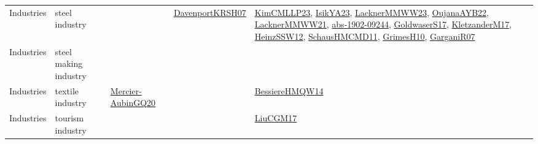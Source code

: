 {\begin{longtable}{lp{3cm}>{\raggedright}p{6cm}>{\raggedright}p{6cm}p{8cm}}
Industries & steel industry &  & \href{papers/DavenportKRSH07.pdf}{DavenportKRSH07}\cite{DavenportKRSH07} & \href{papers/KimCMLLP23.pdf}{KimCMLLP23}\cite{KimCMLLP23}, \href{articles/IsikYA23.pdf}{IsikYA23}\cite{IsikYA23}, \href{articles/LacknerMMWW23.pdf}{LacknerMMWW23}\cite{LacknerMMWW23}, \href{papers/OujanaAYB22.pdf}{OujanaAYB22}\cite{OujanaAYB22}, \href{papers/LacknerMMWW21.pdf}{LacknerMMWW21}\cite{LacknerMMWW21}, \href{articles/abs-1902-09244.pdf}{abs-1902-09244}\cite{abs-1902-09244}, \href{papers/GoldwaserS17.pdf}{GoldwaserS17}\cite{GoldwaserS17}, \href{papers/KletzanderM17.pdf}{KletzanderM17}\cite{KletzanderM17}, \href{articles/HeinzSSW12.pdf}{HeinzSSW12}\cite{HeinzSSW12}, \href{articles/SchausHMCMD11.pdf}{SchausHMCMD11}\cite{SchausHMCMD11}, \href{papers/GrimesH10.pdf}{GrimesH10}\cite{GrimesH10}, \href{papers/GarganiR07.pdf}{GarganiR07}\cite{GarganiR07}\\
Industries & steel making industry &  &  & \\
Industries & textile industry & \href{papers/Mercier-AubinGQ20.pdf}{Mercier-AubinGQ20}\cite{Mercier-AubinGQ20} &  & \href{papers/BessiereHMQW14.pdf}{BessiereHMQW14}\cite{BessiereHMQW14}\\
Industries & tourism industry &  &  & \href{papers/LiuCGM17.pdf}{LiuCGM17}\cite{LiuCGM17}\\

\end{longtable}}
